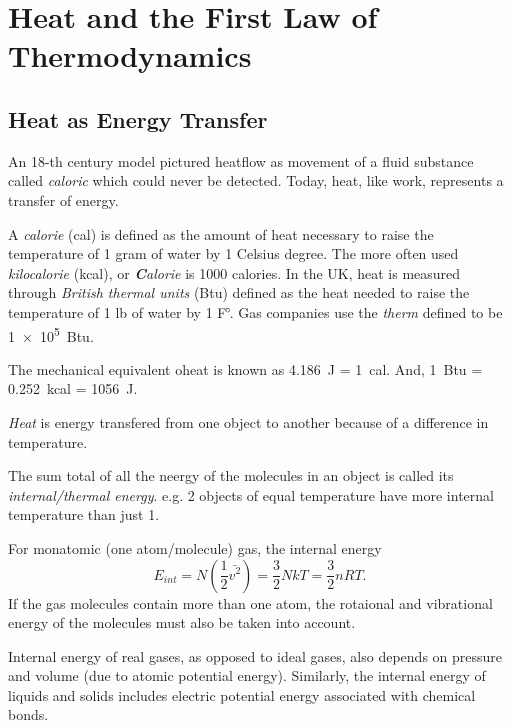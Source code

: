 \chapter{Heat and the First Law of Thermodynamics}

\section{Heat as Energy Transfer}

\begin{remark}
    An 18-th century model pictured heatflow as movement of a fluid substance called \emph{caloric} which could never be detected. Today, heat, like work, represents a transfer of energy.
\end{remark}
\begin{definition}[Calorie]
    A \emph{calorie} (cal) is defined as the amount of heat necessary to raise the temperature of 1 gram of water by 1 Celsius degree. The more often used \emph{kilocalorie} (kcal), or \emph{\textbf{C}alorie} is 1000 calories. In the UK, heat is measured through \emph{British thermal units} (Btu) defined as the heat needed to raise the temperature of 1 lb of water by 1 F$\operatorname{\!^{\circ}\!}$. Gas companies use the \emph{therm} defined to be \qty{1e5}{Btu}.
\end{definition}
\begin{note}
    The mechanical equivalent oheat is known as \qty{4.186}{J} = \qty{1}{cal}. And, \qty{1}{Btu} = \qty{0.252}{kcal} = \qty{1056}{J}.
\end{note}
\begin{definition}[Heat]
    \emph{Heat} is energy transfered from one object to another because of a difference in temperature.
\end{definition}

\begin{definition}
    The sum total of all the neergy of the molecules in an object is called its \emph{internal/thermal energy}. e.g. 2 objects of equal temperature have more internal temperature than just 1.

    For monatomic (one atom/molecule) gas, the internal energy $$E_{int} = N(\frac{1}{2}\bar{v^2}) = \frac{3}{2}NkT=\frac{3}{2}nRT.$$ If the gas molecules contain more than one atom, the rotaional and vibrational energy of the molecules must also be taken into account.
\end{definition}
\begin{remark}
    Internal energy of real gases, as opposed to ideal gases, also depends on pressure and volume (due to atomic potential energy). Similarly, the internal energy of liquids and solids includes electric potential energy associated with chemical bonds. 
\end{remark}

